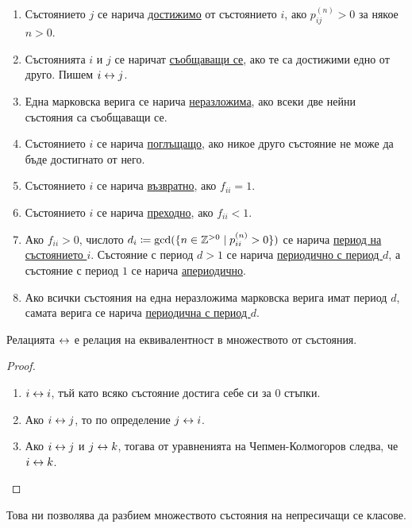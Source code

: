 \documentclass[numbers=endperiod, DIV=15, bibliography=totocnumbered]{scrartcl}
\begin{document}
\begin{definition}
  \mbox{}
  \begin{enumerate}
    \item Състоянието $j$ се нарича \uline{достижимо} от състоянието $i$, ако $p^{(n)}_{ij} > 0$ за някое $n > 0$.
    \item Състоянията $i$ и $j$ се наричат \uline{съобщаващи се}, ако те са достижими едно от друго. Пишем $i \leftrightarrow j$.
    \item Една марковска верига се нарича \uline{неразложима}, ако всеки две нейни състояния са съобщаващи се.
    \item Състоянието $i$ се нарича \uline{поглъщащо}, ако никое друго състояние не може да бъде достигнато от него.
    \item Състоянието $i$ се нарича \uline{възвратно}, ако $f_{ii} = 1$.
    \item Състоянието $i$ се нарича \uline{преходно}, ако $f_{ii} < 1$.
    \item Ако $f_{ii} > 0$, числото $d_i \coloneqq \gcd (\{ n \in \mathbb{Z}^{> 0} \mid p_{ii}^{(n)} > 0 \})$ се нарича \uline{период на състоянието $i$}. Състояние с период $d > 1$ се нарича \uline{периодично с период $d$}, а състояние с период $1$ се нарича \uline{апериодично}.
    \item Ако всички състояния на една неразложима марковска верига имат период $d$, самата верига се нарича \uline{периодична с период $d$}.
  \end{enumerate}
\end{definition}

\begin{proposition}
  Релацията $\leftrightarrow$ е релация на еквивалентност в множеството от състояния.
\end{proposition}
\begin{proof}
  \mbox{}
  \begin{enumerate}
    \item $i \leftrightarrow i$, тъй като всяко състояние достига себе си за $0$ стъпки.
    \item Ако $i \leftrightarrow j$, то по определение $j \leftrightarrow i$.
    \item Ако $i \leftrightarrow j$ и $j \leftrightarrow k$, тогава от уравненията на Чепмен-Колмогоров следва, че $i \leftrightarrow k$.
  \end{enumerate}
\end{proof}

Това ни позволява да разбием множеството състояния на непресичащи се класове.
\end{document}
